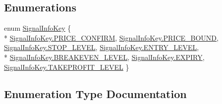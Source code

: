 \subsection*{Enumerations}
\begin{DoxyCompactItemize}
\item 
enum \hyperlink{namespace_m_q_l4_c_sharp_1_1_base_1_1_common_a7f4b5e1e5eb42605189fc27133264d58}{Signal\+Info\+Key} \{ \\*
\hyperlink{namespace_m_q_l4_c_sharp_1_1_base_1_1_common_a7f4b5e1e5eb42605189fc27133264d58a418b27d784ee325ae7fc1045dfb4b31f}{Signal\+Info\+Key.\+P\+R\+I\+C\+E\+\_\+\+C\+O\+N\+F\+I\+RM}, 
\hyperlink{namespace_m_q_l4_c_sharp_1_1_base_1_1_common_a7f4b5e1e5eb42605189fc27133264d58a3919ca254b6bf5e7d545cc84bb6ff798}{Signal\+Info\+Key.\+P\+R\+I\+C\+E\+\_\+\+B\+O\+U\+ND}, 
\hyperlink{namespace_m_q_l4_c_sharp_1_1_base_1_1_common_a7f4b5e1e5eb42605189fc27133264d58a744c06ba3d7ad9fb46e4bec491441902}{Signal\+Info\+Key.\+S\+T\+O\+P\+\_\+\+L\+E\+V\+EL}, 
\hyperlink{namespace_m_q_l4_c_sharp_1_1_base_1_1_common_a7f4b5e1e5eb42605189fc27133264d58a2cd07eb6c0aee86f5391af90f8eb5083}{Signal\+Info\+Key.\+E\+N\+T\+R\+Y\+\_\+\+L\+E\+V\+EL}, 
\\*
\hyperlink{namespace_m_q_l4_c_sharp_1_1_base_1_1_common_a7f4b5e1e5eb42605189fc27133264d58a1e7759cecba432fa92988dfdd27ddd2d}{Signal\+Info\+Key.\+B\+R\+E\+A\+K\+E\+V\+E\+N\+\_\+\+L\+E\+V\+EL}, 
\hyperlink{namespace_m_q_l4_c_sharp_1_1_base_1_1_common_a7f4b5e1e5eb42605189fc27133264d58ab737102a48b5eb1adc0a12385033af09}{Signal\+Info\+Key.\+E\+X\+P\+I\+RY}, 
\hyperlink{namespace_m_q_l4_c_sharp_1_1_base_1_1_common_a7f4b5e1e5eb42605189fc27133264d58a4f8bd1403fe7f4f91bbcf53793ccfd27}{Signal\+Info\+Key.\+T\+A\+K\+E\+P\+R\+O\+F\+I\+T\+\_\+\+L\+E\+V\+EL}
 \}
\end{DoxyCompactItemize}


\subsection{Enumeration Type Documentation}
